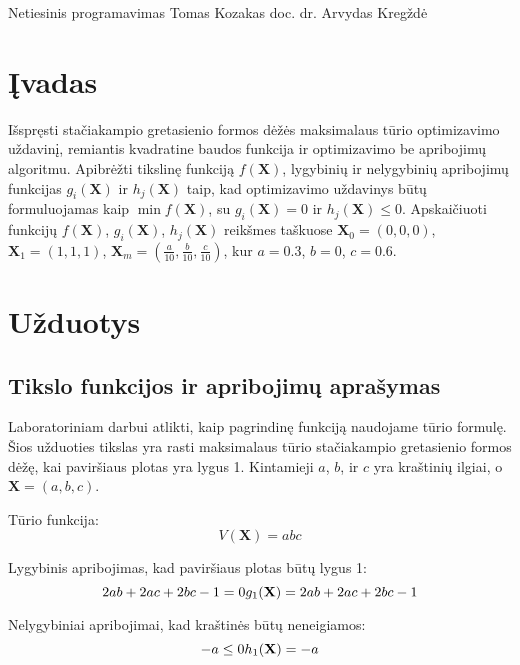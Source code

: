 \documentclass[a4paper,12pt,fleqn]{article}
\begin{document}
 {Netiesinis programavimas}
 {Tomas Kozakas} 
 {}{}{}{}%
 {doc. dr. Arvydas Kregždė}

\tableofcontents
\pagebreak

\section{Įvadas}
Išspręsti stačiakampio gretasienio formos dėžės maksimalaus tūrio optimizavimo uždavinį, remiantis kvadratine baudos funkcija ir optimizavimo be apribojimų algoritmu. Apibrėžti tikslinę funkciją $f(\mathbf{X})$, lygybinių ir nelygybinių apribojimų funkcijas $g_i(\mathbf{X})$ ir $h_j(\mathbf{X})$ taip, kad optimizavimo uždavinys būtų formuluojamas kaip $\min f(\mathbf{X})$, su $g_i(\mathbf{X}) = 0$ ir $h_j(\mathbf{X}) \leq 0$. Apskaičiuoti funkcijų $f(\mathbf{X})$, $g_i(\mathbf{X})$, $h_j(\mathbf{X})$ reikšmes taškuose $\mathbf{X}_0 = (0, 0, 0)$, $\mathbf{X}_1 = (1, 1, 1)$, $\mathbf{X}_m = \left(\frac{a}{10}, \frac{b}{10}, \frac{c}{10}\right)$, kur $a = 0.3$, $b = 0$, $c = 0.6$.


\pagebreak
\section{Užduotys}
\subsection{Tikslo funkcijos ir apribojimų aprašymas}
Laboratoriniam darbui atlikti, kaip pagrindinę funkciją naudojame tūrio formulę. Šios užduoties tikslas yra rasti maksimalaus tūrio stačiakampio gretasienio formos dėžę, kai paviršiaus plotas yra lygus 1. Kintamieji $a$, $b$, ir $c$ yra kraštinių ilgiai, o $\mathbf{X} = (a,b,c)$.

Tūrio funkcija:
\begin{equation}
V(\mathbf{X}) = abc
\end{equation}

Lygybinis apribojimas, kad paviršiaus plotas būtų lygus 1:
\begin{equation}
2ab + 2ac + 2bc - 1 = 0 \\
g_1(\mathbf{X}) = 2ab + 2ac + 2bc - 1
\end{equation}

Nelygybiniai apribojimai, kad kraštinės būtų neneigiamos:
\begin{equation}
-a \leq 0 \\
h_1(\mathbf{X}) = -a \\
\end{equation}
\end{document}
